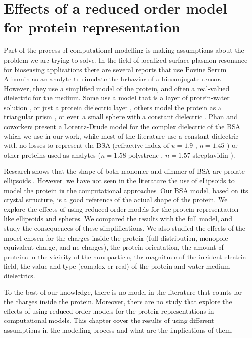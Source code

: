 \chapter{Effects of a reduced order model for protein representation}
\graphicspath{{rom_studies/figs/}}

Part of the process of computational modelling is making assumptions about the problem we are trying to solve. In the 
field of localized surface plasmon resonance for biosensing applications there are several reports that use Bovine Serum Albumin 
as an analyte to simulate the behavior of a bioconjugate sensor. However, they use a simplified model
of the protein, and often a real-valued dielectric for the medium. Some use a model that is 
a layer of protein-water solution \cite{PhanETal2013}, 
or just a protein dielectric layer \cite{NghiemETal2012}, others model the
protein as a triangular prism \cite{DanHu2014}, or even a small sphere with a 
constant dielectric \cite{AntosiewiczApellClaudioKall2011, DavisGomezVernon2010,SantiagoCordobaETal2011, UngerETal2009}. Phan and 
coworkers \cite{PhanETal2013} present a Lorentz-Drude model for the complex 
dielectric of the BSA which we use in our work, while most of the literature 
use a constant dielectric with no losses to represent the BSA 
(refractive index of $n= 1.9$ \cite{NghiemETal2012}, $n= 1.45$ \cite{SantiagoCordobaETal2011}) or
other proteins used as analytes ($n=1.58$ polystrene \cite{UngerETal2009}, $n=1.57$ 
streptavidin \cite{ShenETal2013}). 

Research shows that the shape of both monomer and dimmer of BSA are prolate ellipsoids 
\cite{MoserETal1966, SquireETal1968, WrightETal1975}. However, we have not seen in the literature the use of ellipsoids 
to model the protein in the computational approaches. Our BSA model, based on its crystal 
structure, is a good reference of the actual shape of the protein. We 
explore the effects of using reduced-order models for the protein representation like ellipsoids and spheres. We compared 
the results with the full model, and study the consequences of these simplifications. We also studied the effects of the model chosen 
for the charges inside the protein (full distribution, monopole equivalent charge, and no charges), the protein orientation, the 
amount of proteins in the vicinity of the nanoparticle, the magnitude of the incident electric field, the value and type (complex or real)
of the protein and water medium dielectrics. 

To the best of our knowledge, there is no model in the literature that counts for the charges inside the protein. 
Moreover, there are no study that explore the effects of using reduced-order models for the protein representations 
in computational models. This chapter cover the results of using different assumptions in the modelling process and what 
are the implications of them.

